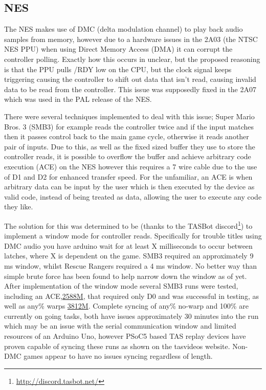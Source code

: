 \documentclass{article}
\begin{document}
\subsection{NES}

The NES makes use of DMC (delta modulation channel) to play back audio samples from memory, however due to a hardware issues in the 2A03 (the NTSC NES PPU) when using Direct Memory Access (DMA) it can corrupt the controller polling.  Exactly how this occurs in unclear, but the proposed reasoning is that the PPU pulls /RDY low on the CPU, but the clock signal keeps triggering causing the controller to shift out data that isn’t read, causing invalid data to be read from the controller.   This issue was supposedly fixed in the 2A07 which was used in the PAL release of the NES.  

There were several techniques implemented to deal with this issue; Super Mario Bros. 3 (SMB3) for example reads the controller twice and if the input matches then it passes control back to the main game cycle, otherwise it reads another pair of inputs.  Due to this, as well as the fixed sized buffer they use to store the controller reads, it is possible to overflow the buffer and achieve arbitrary code execution (ACE) on the NES however this requires a 7 wire cable due to the use of D1 and D2 for enhanced transfer speed.  For the unfamiliar, an ACE is when arbitrary data can be input by the user which is then executed by the device as valid code, instead of being treated as data, allowing the user to execute any code they like.
	
The solution for this was determined to be (thanks to the TASBot discord\footnote{\href{http://discord.tasbot.net/}{http://discord.tasbot.net/}}) to implement a window mode for controller reads.  Specifically for trouble titles using DMC audio you have arduino wait for at least X milliseconds to occur between latches, where X is dependent on the game.  SMB3 required an approximately 9 ms window, whilst Rescue Rangers required a 4 ms window.  No better way than simple brute force has been found to help narrow down the window as of yet. After implementation of the window mode several SMB3 runs were tested, including an ACE,\href{tasvideos.org/2588M.html}{2588M}, that required only D0 and was successful in testing, as well as any\% warps \href{tasvideos.org/3812M.html}{3812M}.  Complete syncing of any\% no-warp and 100\% are currently on going tasks, both have issues approximately 30 minutes into the run which may be an issue with the serial communication window and limited resources of an Arduino Uno, however PSoC5 based TAS replay devices have proven capable of syncing these runs as shown on the tasvideos website.  Non-DMC games appear to have no issues syncing regardless of length.  
\end{document}
